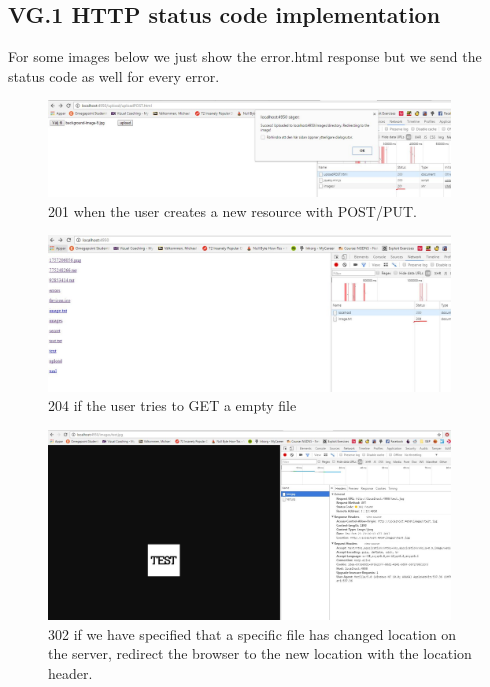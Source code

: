 \documentclass[a4paper,12pt]{article}
\numberwithin{figure}{section}
\begin{document}
\newpage
\subsection{VG.1 HTTP status code implementation}

For some images below we just show the error.html response but we send the status code as well for every error.

\begin{figure}[h!]
	\centering
	\label{201}
	\includegraphics[width=0.95\textwidth,keepaspectratio]{img/201.jpg} 
	\caption{201 when the user creates a new resource with POST/PUT.}
\end{figure}

\begin{figure}[h!]
	\centering
	\label{204}
	\includegraphics[width=0.95\textwidth,keepaspectratio]{img/204.jpg} 
	\caption{204 if the user tries to GET a empty file}
\end{figure}

\begin{figure}[h!]
	\centering
	\label{302}
	\includegraphics[width=0.95\textwidth,keepaspectratio]{img/302.jpg} 
	\caption{302 if we have specified that a specific file has changed location on the server, redirect the browser to the new location with the location header.}
\end{figure}
\end{document}
